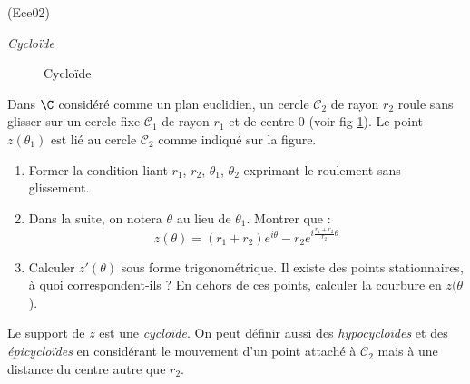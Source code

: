 \begin{tiny}(Ece02)\end{tiny} \emph{Cycloïde}\newline
\begin{figure}[ht]
 \centering

\caption{Cycloïde}
\label{fig:Ece02_1}
\end{figure}

Dans $\C$ considéré comme un plan euclidien, un cercle $\mathcal C_2$ de rayon $r_2$ roule sans glisser sur un cercle fixe $\mathcal C_1$ de rayon $r_1$ et de centre $0$ (voir fig \ref{fig:Ece02_1}). Le point $z(\theta_1)$ est lié au cercle $\mathcal C_2$ comme indiqué sur la figure.
\begin{enumerate}
 \item Former la condition liant $r_1$, $r_2$, $\theta_1$, $\theta_2$ exprimant le roulement sans glissement.
\item Dans la suite, on notera $\theta$ au lieu de $\theta_1$. Montrer que :
\begin{displaymath}
 z(\theta)=
(r_1+r_2)e^{i\theta} - r_2 e^{i\frac{r_1+r_2}{r_2}\theta}
\end{displaymath}
\item Calculer $z'(\theta)$ sous forme trigonométrique. Il existe des points stationnaires, à quoi correspondent-ils ? En dehors de ces points, calculer la courbure en $z(\theta$).
\end{enumerate}
Le support de $z$ est une \emph{cycloïde}. On peut définir aussi des \emph{hypocycloïdes} et des \emph{épicycloïdes} en considérant le mouvement d'un point attaché à $\mathcal C_2$ mais à une distance du centre autre que $r_2$.
